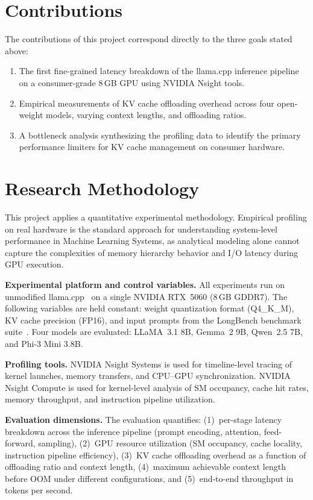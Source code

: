\documentclass[
english,                 %
bibtex,                  %
]{kththesis}
\numberwithin{listing}{chapter}
\begin{document}
\section{Contributions}
\label{sec:contributions}
The contributions of this project correspond directly to the three goals stated above:

\begin{enumerate}
\item The first fine-grained latency breakdown of the llama.cpp inference pipeline on a consumer-grade 8\,GB \gls{GPU} using NVIDIA Nsight tools.
\item Empirical measurements of \gls{KV} cache offloading overhead across four open-weight models, varying context lengths, and offloading ratios.
\item A bottleneck analysis synthesizing the profiling data to identify the primary performance limiters for \gls{KV} cache management on consumer hardware.
\end{enumerate}

\section{Research Methodology}
\label{sec:methodology}
This project applies a quantitative experimental methodology. Empirical profiling on real hardware is the standard approach for understanding system-level performance in Machine Learning Systems, as analytical modeling alone cannot capture the complexities of memory hierarchy behavior and I/O latency during \gls{GPU} execution.

\textbf{Experimental platform and control variables.} All experiments run on unmodified llama.cpp~\cite{llamacpp2025} on a single NVIDIA RTX~5060 (8\,GB GDDR7). The following variables are held constant: weight quantization format (Q4\_K\_M), \gls{KV} cache precision (\gls{FP16}), and input prompts from the LongBench benchmark suite~\cite{bai2024longbench}. Four models are evaluated: LLaMA~3.1 8B, Gemma~2 9B, Qwen~2.5 7B, and Phi-3 Mini 3.8B.

\textbf{Profiling tools.} NVIDIA Nsight Systems is used for timeline-level tracing of kernel launches, memory transfers, and \gls{CPU}--\gls{GPU} synchronization. NVIDIA Nsight Compute is used for kernel-level analysis of \gls{SM} occupancy, cache hit rates, memory throughput, and instruction pipeline utilization.

\textbf{Evaluation dimensions.} The evaluation quantifies: (1)~per-stage latency breakdown across the inference pipeline (prompt encoding, attention, feed-forward, sampling), (2)~\gls{GPU} resource utilization (\gls{SM} occupancy, cache locality, instruction pipeline efficiency), (3)~\gls{KV} cache offloading overhead as a function of offloading ratio and context length, (4)~maximum achievable context length before \gls{OOM} under different configurations, and (5)~end-to-end throughput in tokens per second.
\end{document}
